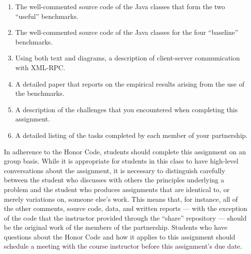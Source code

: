 \vspace*{-.15in}

\begin{enumerate}
  \itemsep 0em

    \item The well-commented source code of the Java classes that form the two ``useful'' benchmarks.

    \item The well-commented source code of the Java classes for the four ``baseline'' benchmarks.

    \item Using both text and diagrams, a description of client-server communication with XML-RPC.

    \item A detailed paper that reports on the empirical results arising from the use of the benchmarks.

    \item A description of the challenges that you encountered when completing this assignment.

    \item A detailed listing of the tasks completed by each member of your partnership.

\end{enumerate}

\vspace*{-.15in}


In adherence to the Honor Code, students should complete this assignment on an group basis. While it is appropriate for
students in this class to have high-level conversations about the assignment, it is necessary to distinguish carefully
between the student who discusses with others the principles underlying a problem and the student who produces
assignments that are identical to, or merely variations on, someone else's work.  This means that, for instance, all of
the other comments, source code, data, and written reports --- with the exception of the code that the instructor
provided through the ``share'' repository --- should be the original work of the members of the partnership.  Students
who have questions about the Honor Code and how it applies to this assignment should schedule a meeting with the course
instructor before this assignment's due date.



